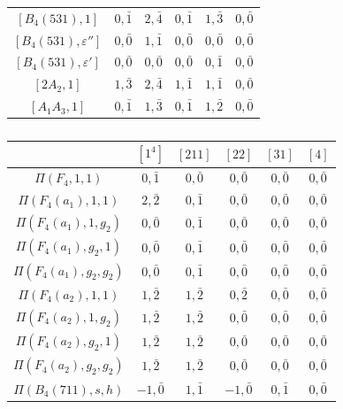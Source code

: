 \begin{table}[ht]
\begin{tabular}{|c|ccccc|}
            $[B_4(531),1]$ & $0,\bar1$ & $2,\bar{4}$ & $0,\bar1$ & $1,\bar{3}$ & $0,\bar0$ \\
            $[B_4(531),\varepsilon'']$ & $0,\bar0$ & $1,\bar1$ & $0,\bar0$ & $0,\bar0$ & $0,\bar0$ \\
            $[B_4(531),\varepsilon']$ & $0,\bar0$ & $0,\bar0$ & $0,\bar0$ & $0,\bar1$ & $0,\bar0$ \\
            $[2A_2,1]$ & $1,\bar{3}$ & $2,\bar{4}$ & $1,\bar1$ & $1,\bar1$ & $0,\bar0$ \\
            $[A_1A_3,1]$ & $0,\bar1$ & $1,\bar{3}$ & $0,\bar1$ & $1,\bar2$ & $0,\bar0$ \\\hline
        \end{tabular}
    \end{table}

    \begin{table}[h!]
        \centering
        \caption{} \label{tbl:F4_K2}
        \begin{tabular}{|c|ccccc|}
            \hline
            & $[1^4]$ & $[211]$ & $[22]$ & $[31]$ & $[4]$ \\\hline
            $\Pi(F_4,1,1)$ & $0,\bar1$ & $0,\bar0$ & $0,\bar0$ & $0,\bar0$ & $0,\bar0$ \\\hline
            $\Pi(F_4(a_1),1,1)$ & $2,\bar2$ & $0,\bar1$ & $0,\bar0$ & $0,\bar0$ & $0,\bar0$ \\
            $\Pi(F_4(a_1),1,g_2)$ & $0,\bar0$ & $0,\bar1$ & $0,\bar0$ & $0,\bar0$ & $0,\bar0$ \\
            $\Pi(F_4(a_1),g_2,1)$ & $0,\bar0$ & $0,\bar1$ & $0,\bar0$ & $0,\bar0$ & $0,\bar0$ \\
            $\Pi(F_4(a_1),g_2,g_2)$ & $0,\bar0$ & $0,\bar1$ & $0,\bar0$ & $0,\bar0$ & $0,\bar0$ \\\hline
            $\Pi(F_4(a_2),1,1)$ & $1,\bar2$ & $1,\bar2$ & $0,\bar2$ & $0,\bar0$ & $0,\bar0$ \\
            $\Pi(F_4(a_2),1,g_2)$ & $1,\bar2$ & $1,\bar2$ & $0,\bar0$ & $0,\bar0$ & $0,\bar0$ \\
            $\Pi(F_4(a_2),g_2,1)$ & $1,\bar2$ & $1,\bar2$ & $0,\bar0$ & $0,\bar0$ & $0,\bar0$ \\
            $\Pi(F_4(a_2),g_2,g_2)$ & $1,\bar2$ & $1,\bar2$ & $0,\bar0$ & $0,\bar0$ & $0,\bar0$ \\\hline
            $\Pi(B_4(711),s,h)$ & $-1,\bar0$ & $1,\bar1$ & $-1,\bar0$ & $0,\bar1$ & $0,\bar0$ \\\hline

\end{tabular}
\end{table}
